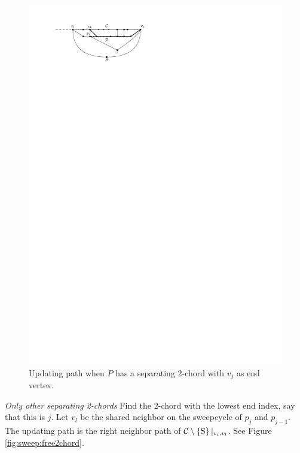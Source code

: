     \begin{figure}[h]
      \centering
      \includegraphics[scale=1]{unifiedAlgo/img/sweep/pEBound}
      \caption{Updating path when $P$ has a separating 2-chord with $v_j$ as end vertex.}
      \label{fig:sweep:pEBound}
    \end{figure}
    \emph{Only other separating 2-chords}
      Find the $2$-chord with the lowest end index, say that this is $j$.
      Let $v_l$ be the shared neighbor on the sweepcycle of $p_{j}$ and $p_{j-1}$.
      The updating path is the right neighbor path of $\mathcal{C} \setminus \left\lbrace {\mathrm{S}} \right\rbrace|_{v_i, v_l}$. See Figure \ref{fig:sweep:free2chord}.

